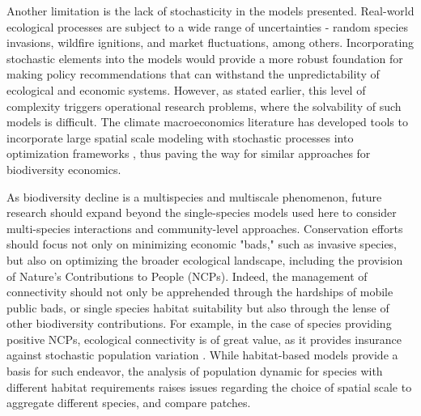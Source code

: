 Another limitation is the lack of stochasticity in the models presented. Real-world ecological processes are subject to a wide range of uncertainties - random species invasions, wildfire ignitions, and market fluctuations, among others. Incorporating stochastic elements into the models would provide a more robust foundation for making policy recommendations that can withstand the unpredictability of ecological and economic systems. However, as stated earlier, this level of complexity triggers operational research problems, where the solvability of such models is difficult. The climate macroeconomics literature has developed tools to incorporate large spatial scale modeling with stochastic processes into optimization frameworks \citep{cai_modeling_2020,fernandez-villaverde_climate_2024}, thus paving the way for similar approaches for biodiversity economics. 

As biodiversity decline is a multispecies and multiscale phenomenon, future research should expand beyond the single-species models used here to consider multi-species interactions and community-level approaches. Conservation efforts should focus not only on minimizing economic "bads," such as invasive species, but also on optimizing the broader ecological landscape, including the provision of Nature's Contributions to People (NCPs). Indeed, the management of connectivity should not only be apprehended through the hardships of mobile public bads, or single species habitat suitability but also through the lense of other biodiversity contributions. For example, in the case of species providing positive NCPs, ecological connectivity is of great value, as it provides insurance against stochastic population variation \citep{loreau_biodiversity_2003}. While habitat-based models provide a basis for such endeavor, the analysis of population dynamic for species with different habitat requirements raises issues regarding the choice of spatial scale to aggregate different species, and compare patches.


